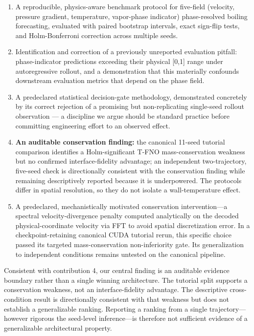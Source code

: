 \documentclass[preprint,12pt]{elsarticle}
\providecommand{\tightlist}{\setlength{\itemsep}{0pt}\setlength{\parskip}{0pt}}
\begin{document}
\begin{enumerate}
\def\labelenumi{\arabic{enumi}.}
\tightlist
\item
  A reproducible, physics-aware benchmark protocol for five-field
  (velocity, pressure gradient, temperature, vapor-phase indicator)
  phase-resolved boiling forecasting, evaluated with paired bootstrap
  intervals, exact sign-flip tests, and Holm-Bonferroni correction
  across multiple seeds.
\item
  Identification and correction of a previously unreported evaluation
  pitfall: phase-indicator predictions exceeding their physical
  {[}0,1{]} range under autoregressive rollout, and a demonstration that
  this materially confounds downstream evaluation metrics that depend on
  the phase field.
\item
  A predeclared statistical decision-gate methodology, demonstrated
  concretely by its correct rejection of a promising but non-replicating
  single-seed rollout observation --- a discipline we argue should be
  standard practice before committing engineering effort to an observed
  effect.
\item
  \textbf{An auditable conservation finding:} the canonical 11-seed
  tutorial comparison identifies a Holm-significant T-FNO
  mass-conservation weakness but no confirmed interface-fidelity
  advantage; an independent two-trajectory, five-seed check is
  directionally consistent with the conservation finding while remaining
  descriptively reported because it is underpowered. The protocols
  differ in spatial resolution, so they do not isolate a
  wall-temperature effect.
\item
  A predeclared, mechanistically motivated conservation intervention---a
  spectral velocity-divergence penalty computed analytically on the
  decoded physical-coordinate velocity via FFT to avoid spatial
  discretization error. In a checkpoint-retaining canonical CUDA
  tutorial rerun, this specific choice passed its targeted
  mass-conservation non-inferiority gate. Its generalization to
  independent conditions remains untested on the canonical pipeline.
\end{enumerate}

Consistent with contribution 4, our central finding is an auditable
evidence boundary rather than a single winning architecture. The
tutorial split supports a conservation weakness, not an
interface-fidelity advantage. The descriptive cross-condition result is
directionally consistent with that weakness but does not establish a
generalizable ranking. Reporting a ranking from a single
trajectory---however rigorous the seed-level inference---is therefore
not sufficient evidence of a generalizable architectural property.
\end{document}
